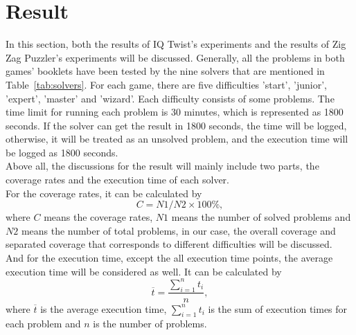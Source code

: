 \section{Result}
\label{sec:Result}
In this section, both the results of IQ Twist's experiments and the results of Zig Zag Puzzler's experiments will be discussed. Generally, all the problems in both games' booklets have been tested by the nine solvers that are mentioned in Table~\ref{tab:solvers}. For each game, there are five difficulties 'start', 'junior', 'expert', 'master' and 'wizard'. Each difficulty consists of some problems. The time limit for running each problem is 30 minutes, which is represented as 1800 seconds. If the solver can get the result in 1800 seconds, the time will be logged, otherwise, it will be treated as an unsolved problem, and the execution time will be logged as 1800 seconds. 
\\Above all, the discussions for the result will mainly include two parts, the coverage rates and the execution time of each solver. 
\\For the coverage rates, it can be calculated by 
\begin{equation}
\label{equation:coverage}
   C= N1/N2\times 100\% ,
\end{equation}
where $C$ means the coverage rates, $N1$ means the number of solved problems and $N2$ means the number of total problems, in our case, the overall coverage and separated coverage that corresponds to different difficulties will be discussed.
\\And for the execution time, except the all execution time points, the average execution time will be considered as well. It can be calculated by 
\begin{equation}
\label{equation:averagetime}
\overline{t}=\frac{\sum\limits_{i=1}^n t_{i}}{n},
\end{equation}
where $\overline{t}$ is the average execution time, $\sum\limits_{i=1}^n t_{i}$ is the sum of execution times for each problem and $n$ is the number of problems.
